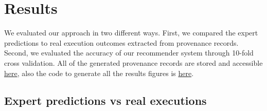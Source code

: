 \documentclass[conference]{IEEEtran}
\begin{document}





\section{Results}

We evaluated our approach in two different ways. First, 
we compared the expert predictions to 
real execution outcomes extracted from provenance records.
Second, we evaluated 
the accuracy of our recommender system through 10-fold cross validation. All of the generated provenance records are stored and accessible \href{https://github.com/mandana-mazaheri/conp-pipeline-examples/tree/a2c80c91c50776dfc831f89d294e3cb862a3d9a6}{here}, also the code to generate all the results figures is \href{https://github.com/mandana-mazaheri/Pipelines-datasets-recommender-paper/blob/master/scripts/scientificRecommender_v4.py}{here}.

\subsection{Expert predictions vs real executions}

\end{document}
